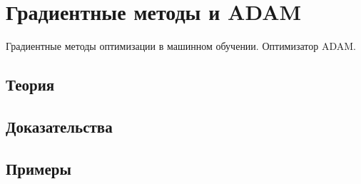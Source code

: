 
\section{Градиентные методы и ADAM}
\label{sec:1.4.09-gradient-adam}

\begin{ticket}
Градиентные методы оптимизации в машинном обучении. Оптимизатор ADAM.
\end{ticket}

\subsection*{Теория}

\subsection*{Доказательства}

\subsection*{Примеры}
